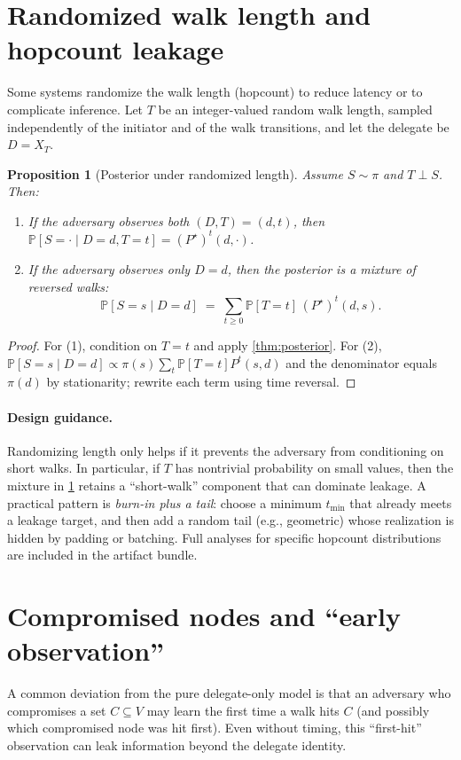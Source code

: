 \documentclass[11pt]{article}
\newtheorem{proposition}[theorem]{Proposition}
\newcommand{\Prb}{\mathbb{P}}
\begin{document}
\section{Randomized walk length and hopcount leakage}\label{sec:randlen}
Some systems randomize the walk length (hopcount) to reduce latency or to
complicate inference. Let $T$ be an integer-valued random walk length, sampled
independently of the initiator and of the walk transitions, and let the delegate
be $D=X_T$.

\begin{proposition}[Posterior under randomized length]\label{prop:randlen}
Assume $S\sim\pi$ and $T\perp S$. Then:
\begin{enumerate}[leftmargin=1.6em]
\item If the adversary observes both $(D,T)=(d,t)$, then
$\Prb[S=\cdot\mid D=d,T=t]=(P^\star)^t(d,\cdot)$.
\item If the adversary observes only $D=d$, then the posterior is a mixture of
reversed walks:
\[
\Prb[S=s\mid D=d] \;=\; \sum_{t\ge 0} \Prb[T=t]\,(P^\star)^t(d,s).
\]
\end{enumerate}
\end{proposition}

\begin{proof}
For (1), condition on $T=t$ and apply \cref{thm:posterior}. For (2),
$\Prb[S=s\mid D=d]\propto \pi(s)\sum_t \Prb[T=t]P^t(s,d)$ and the denominator
equals $\pi(d)$ by stationarity; rewrite each term using time reversal.
\end{proof}

\paragraph{Design guidance.}
Randomizing length only helps if it prevents the adversary from conditioning on
short walks. In particular, if $T$ has nontrivial probability on small values,
then the mixture in \cref{prop:randlen} retains a ``short-walk'' component that
can dominate leakage. A practical pattern is \emph{burn-in plus a tail}:
choose a minimum $t_{\min}$ that already meets a leakage target, and then add a
random tail (e.g., geometric) whose realization is hidden by padding or batching.
Full analyses for specific hopcount distributions are included in the artifact
bundle.

\section{Compromised nodes and ``early observation''}\label{sec:compromise}
A common deviation from the pure delegate-only model is that an adversary who
compromises a set $C\subseteq V$ may learn the first time a walk hits $C$ (and
possibly which compromised node was hit first). Even without timing, this
``first-hit'' observation can leak information beyond the delegate identity.
\end{document}
